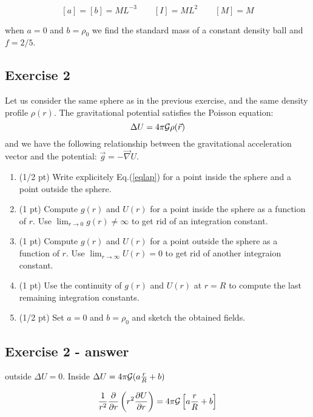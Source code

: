 \[
[a]=[b]=ML^{-3}
\qquad
[I]= ML^2
\qquad
[M]=M
\]

when $a=0$ and $b=\rho_0$ we find the standard mass of a constant density ball and $f=2/5$.


\subsection*{Exercise 2}





Let us consider the same sphere as in the previous exercise, and the same density profile $\rho(r)$.
The gravitational potential satisfies the Poisson equation:
\begin{equation}
\Delta U = 4 \pi {\cal G} \rho({\vec r}) \label{eqlap}
\end{equation}
and we have the following relationship between the gravitational acceleration 
vector and the potential: ${\vec g}=-{\vec \nabla} U$.

\begin{enumerate}
\item (1/2 pt) Write explicitely Eq.(\ref{eqlap}) for a point inside the sphere and a point outside the sphere.
\item (1 pt) Compute $g(r)$ and $U(r)$ for a point inside the sphere as a function of $r$. Use
$\lim_{r\rightarrow 0} g(r) \neq \infty$
to get rid of an integration constant.
\item (1 pt) Compute $g(r)$ and $U(r)$ for a point outside the sphere as a function of $r$.
Use $\lim_{r\rightarrow\infty}U(r)=0$ to get rid of another integraion constant.
\item (1 pt) Use the continuity of $g(r)$ and $U(r)$ at $r=R$
to compute the last remaining integration constants.
\item (1/2 pt) Set $a=0$ and $b=\rho_0$ and sketch the obtained fields.
\end{enumerate}



\subsection*{Exercise 2 - answer}

outside $\Delta U=0$. Inside $\Delta U= 4\pi {\cal G} (a\frac{r}{R}+b)$

\begin{equation}
\frac{1}{r^2} \frac{\partial}{\partial r} \left( r^2 \frac{\partial U}{\partial r} \right) = 4 \pi {\cal G} 
\left[ a \frac{r}{R} + b \right] \nonumber
\end{equation}

